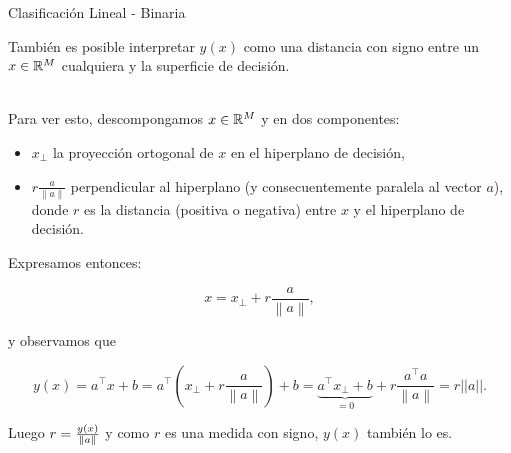 \documentclass[9pt, handout]{beamer}
\begin{document}
\begin{frame}{Clasificación Lineal - Binaria}

  También es posible interpretar $y(x)$ como una distancia con signo entre un $x\in\mathbb{R}^M$ cualquiera y la superficie de decisión. \\~\

  Para ver esto, descompongamos $x\in\mathbb{R}^M$ y en dos componentes: 
  \begin{itemize}
    \item  $x_{\bot}$ la proyección ortogonal de $x$ en el hiperplano de  decisión, 
    \item $r\frac{a}{\left \| a \right \|}$ perpendicular al hiperplano (y consecuentemente paralela al vector $a$), donde $r$ es la distancia (positiva o negativa) entre $x$ y el hiperplano de  decisión. 
  \end{itemize}

  Expresamos entonces:

  \begin{equation*}
    x = x_{\bot}+r\frac{a}{\left \| a \right \|},
  \end{equation*}

  y observamos que \pause

  \begin{equation*}
    y(x) 
    = a^\top x+b 
    =a^\top  \left( x_{\bot} + r\frac{a}{\left \| a \right \|} \right) +b 
    = \underbrace{a^\top x_{\bot} +b }_{=0} +   r\frac{a^\top  a}{\left \| a \right \|}
    = r||a||.
  \end{equation*}

  \pause 

  Luego $r = \frac{y(x)}{\left\lVert a\right\rVert}$ y como $r$ es una medida con signo, $y(x)$ también lo es. 


\end{frame}
\end{document}
